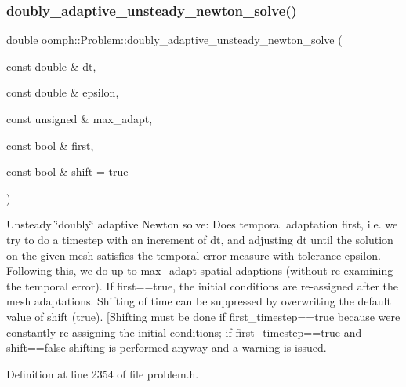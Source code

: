 \mbox{\label{classoomph_1_1Problem_a7561d4f82e1fa625210c58a78294a301}} 
\subsubsection{\texorpdfstring{doubly\+\_\+adaptive\+\_\+unsteady\+\_\+newton\+\_\+solve()}{doubly\_adaptive\_unsteady\_newton\_solve()}\hspace{0.1cm}{\footnotesize\ttfamily [1/2]}}
{\footnotesize\ttfamily double oomph\+::\+Problem\+::doubly\+\_\+adaptive\+\_\+unsteady\+\_\+newton\+\_\+solve (\begin{DoxyParamCaption}\item[{const double \&}]{dt,  }\item[{const double \&}]{epsilon,  }\item[{const unsigned \&}]{max\+\_\+adapt,  }\item[{const bool \&}]{first,  }\item[{const bool \&}]{shift = {\ttfamily true} }\end{DoxyParamCaption})\hspace{0.3cm}{\ttfamily [inline]}}



Unsteady \char`\"{}doubly\char`\"{} adaptive Newton solve\+: Does temporal adaptation first, i.\+e. we try to do a timestep with an increment of dt, and adjusting dt until the solution on the given mesh satisfies the temporal error measure with tolerance epsilon. Following this, we do up to max\+\_\+adapt spatial adaptions (without re-\/examining the temporal error). If first==true, the initial conditions are re-\/assigned after the mesh adaptations. Shifting of time can be suppressed by overwriting the default value of shift (true). \mbox{[}Shifting must be done if first\+\_\+timestep==true because we\textquotesingle{}re constantly re-\/assigning the initial conditions; if first\+\_\+timestep==true and shift==false shifting is performed anyway and a warning is issued. 



Definition at line 2354 of file problem.\+h.




